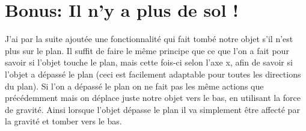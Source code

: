 \documentclass{article}
\begin{document}
\section{Bonus: Il n'y a plus de sol !}
J'ai par la suite ajoutée une fonctionnalité qui fait tombé notre objet s'il n'est plus sur le plan.
Il suffit de faire le même principe que ce que l'on a fait pour savoir si l'objet touche le plan, mais cette fois-ci selon l'axe x, afin de savoir si l'objet a dépassé le plan (ceci est facilement adaptable pour toutes les directions du plan).
Si l'on a dépassé le plan on ne fait pas les même actions que précédemment mais on déplace juste notre objet vers le bas, en utilisant la force de gravité.
Ainsi lorsque l'objet dépasse le plan il va simplement être affecté par la gravité et tomber vers le bas.
\end{document}
